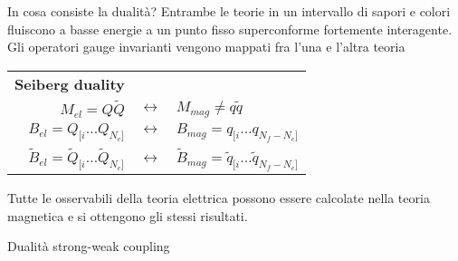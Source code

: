 \documentclass[10pt,compress]{beamer}
\begin{document}
\begin{frame}
\begin{block}{In cosa consiste la dualità?}
Entrambe le teorie in un intervallo di sapori e colori fluiscono a basse energie a un \alert{punto fisso superconforme fortemente interagente.}
\\
\vspace{0.2cm}
Gli operatori \alert{gauge invarianti} vengono mappati fra l'una e l'altra teoria
\begin{table}
\begin{tabular}{r l }
{\bfseries Seiberg duality} &  \\
$M_{el}=Q \tilde{Q} $ & $\longleftrightarrow \quad M_{mag} \neq q \tilde{q}$ \\
$B_{el} = Q_{[i} \dotsc Q_{N_c]}$ & $\longleftrightarrow \quad B_{mag} = q_{[i} \dotsc q_{N_f - N_c]}$\\
$\tilde{B}_{el} = \tilde{Q}_{[i} \dotsc \tilde{Q}_{N_c]}$ & $\longleftrightarrow \quad \tilde{B}_{mag} = \tilde{q}_{[i} \dotsc \tilde{q}_{N_f - N_c]}$\\
\end{tabular}
\end{table}

\end{block}

Tutte le \alert{osservabili} della teoria elettrica possono essere calcolate nella teoria magnetica e si ottengono gli stessi risultati. \\
\vspace{0.3cm}


\end{frame}




\begin{frame}{Dualità strong-weak coupling}


\end{frame}
\end{document}
